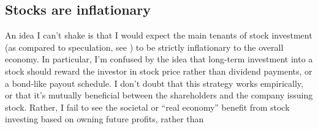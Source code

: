 \subsection{Stocks are inflationary}

An idea I can't shake is that I would expect the main tenants of stock investment (as compared to speculation, see \cite{Graham2024}) to be strictly inflationary to the overall economy.  In particular, I'm confused by the idea that long-term investment into a stock should reward the investor in stock price rather than dividend payments, or a bond-like payout schedule.  I don't doubt that this strategy works empirically, or that it's mutually beneficial between the shareholders and the company issuing stock.  Rather, I fail to see the societal or ``real economy'' benefit from stock investing based on owning future profits, rather than 